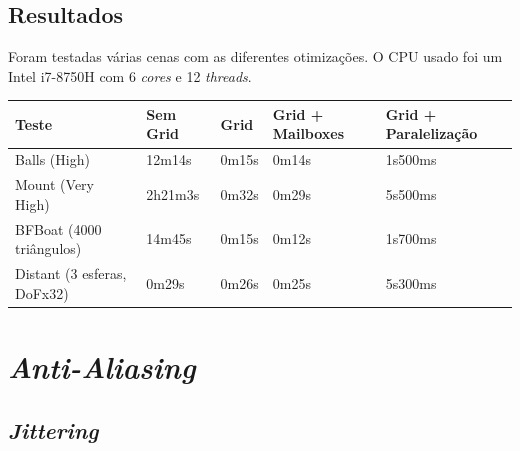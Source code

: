 \documentclass{article}
\begin{document}
        \subsection*{Resultados}
        Foram testadas várias cenas com as diferentes otimizações. O CPU usado foi um Intel i7-8750H com 6 \textit{cores} e 12 \textit{threads}.
        \begin{table}[h]
            \centering
            \begin{tabular}{|l|l|l|l|l|}
                \hline
                Teste                      & Sem Grid & Grid  & Grid + Mailboxes & Grid + Paralelização \\ \hline
                Balls (High)               & 12m14s   & 0m15s & 0m14s            & 1s500ms              \\ \hline
                Mount (Very High)          & 2h21m3s  & 0m32s & 0m29s            & 5s500ms              \\ \hline
                BFBoat (4000 triângulos)   & 14m45s   & 0m15s & 0m12s            & 1s700ms              \\ \hline
                Distant (3 esferas, DoFx32)& 0m29s    & 0m26s & 0m25s            & 5s300ms              \\ \hline
            \end{tabular}
        \end{table}


    \section*{\textit{Anti-Aliasing}}
        \subsection*{\textit{Jittering}}
            \par
\end{document}
